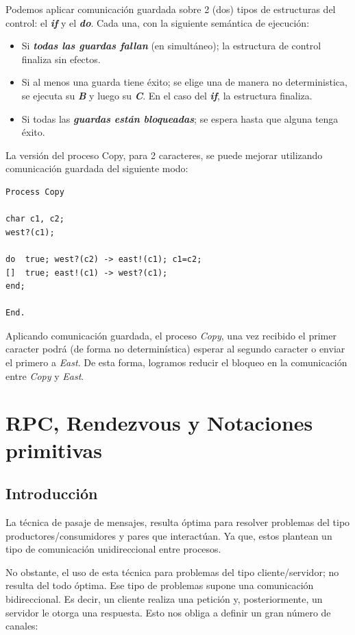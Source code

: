 \documentclass[a4paper, 10pt]{report}
\begin{document}
Podemos aplicar comunicación guardada sobre 2 (dos) tipos de estructuras del control: el \textbf{\emph{if}} y el \textbf{\emph{do}}. Cada una, con la siguiente semántica de ejecución:

\begin{itemize}
	\item Si \textbf{\emph{todas las guardas fallan}} (en simultáneo); la estructura de control finaliza sin efectos.
	\item Si al menos una guarda tiene éxito; se elige una de manera no deterministica, se ejecuta su \textbf{\emph{B}} y luego su \textbf{\emph{C}}. En el caso del \textbf{\emph{if}}, la estructura finaliza.
	\item Si todas las \textbf{\emph{guardas están bloqueadas}}; se espera hasta que alguna tenga éxito.
\end{itemize}

La versión del proceso Copy, para 2 caracteres, se puede mejorar utilizando comunicación guardada del siguiente modo:

\begin{lstlisting}
Process Copy

char c1, c2;
west?(c1);

do  true; west?(c2) -> east!(c1); c1=c2;
[]  true; east!(c1) -> west?(c1);
end;

End.
\end{lstlisting}

Aplicando comunicación guardada, el proceso \emph{Copy}, una vez recibido el primer caracter podrá (de forma no determinística) esperar al segundo caracter o enviar el primero a \emph{East}.
De esta forma, logramos reducir el bloqueo en la comunicación entre \emph{Copy} y \emph{East}.

\chapter{RPC, Rendezvous y Notaciones primitivas}

\section{Introducción}

La técnica de pasaje de mensajes, resulta óptima para resolver problemas del tipo productores/consumidores y pares que interactúan. Ya que, estos plantean un tipo de comunicación unidireccional entre procesos.

No obstante, el uso de esta técnica para problemas del tipo cliente/servidor; no resulta del todo óptima. Ese tipo de problemas supone una comunicación bidireccional. Es decir, un cliente realiza una petición y, posteriormente, un servidor le otorga una respuesta. Esto nos obliga a definir un gran número de canales:
\end{document}
